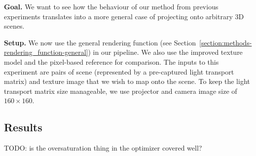 \textbf{Goal.} We want to see how the behaviour of our method from previous experiments translates into a more general case of projecting onto arbitrary 3D scenes.

\textbf{Setup.} We now use the general rendering function (see Section~\ref{section:methods-rendering_function-general}) in our pipeline. We also use the improved texture model and the pixel-based reference for comparison. The inputs to this experiment are pairs of scene (represented by a pre-captured light transport matrix) and texture image that we wish to map onto the scene. To keep the light transport matrix size manageable, we use projector and camera image size of \(160 \times 160\).

\subsection{Results}
\label{section:results-experiments-03-results}

{\color{red} TODO: is the oversaturation thing in the optimizer covered well?}


